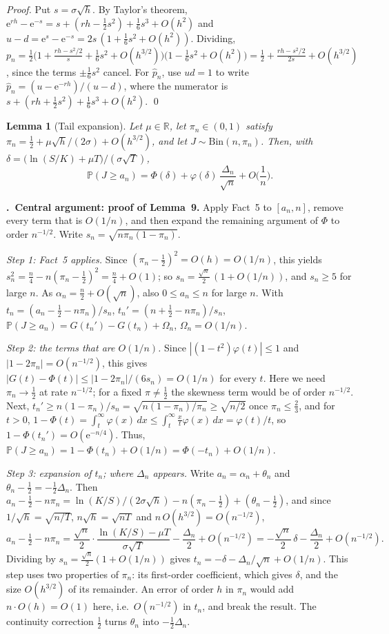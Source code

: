 \documentclass[11pt,a4paper]{article}
\theoremstyle{tight}
\newtheorem{lem}[thm]{Lemma}
\theoremstyle{tightrm}
\newcounter{sect}\setcounter{sect}{-1}
\newcounter{subsect}[sect]
\renewcommand{\thesubsect}{\thesect.\arabic{subsect}}
\newcommand{\subsect}[1]{\par\vspace{1.5pt}\noindent\stepcounter{subsect}\textbf{\thesubsect\ #1}\enspace}
\newcommand{\R}{\mathbb{R}}
\newcommand{\Prob}{\mathbb{P}}
\newcommand{\e}{\mathrm{e}}
\renewenvironment{proof}[1][Proof]{\par\textit{#1.}\enspace}{\qed\par}
\begin{document}
\begin{proof}
Put $s=\sigma\sqrt h$. By Taylor's theorem, $\e^{rh}-\e^{-s}=s+(rh-\tfrac12s^2)+\tfrac16s^3+O(h^2)$ and $u-d=\e^s-\e^{-s}=2s\,(1+\tfrac16s^2+O(h^2))$. Dividing, $p_n=\tfrac12\big(1+\tfrac{rh-s^2/2}{s}+\tfrac16s^2+O(h^{3/2})\big)\big(1-\tfrac16s^2+O(h^2)\big)=\tfrac12+\tfrac{rh-s^2/2}{2s}+O(h^{3/2})$, since the terms $\pm\tfrac16s^2$ cancel. For $\hat p_n$, use $ud=1$ to write $\hat p_n=(u-\e^{-rh})/(u-d)$, where the numerator is $s+(rh+\tfrac12s^2)+\tfrac16s^3+O(h^2)$.
\end{proof}
\begin{lem}[Tail expansion]
Let $\mu\in\R$, let $\pi_n\in(0,1)$ satisfy $\pi_n=\tfrac12+\mu\sqrt h/(2\sigma)+O(h^{3/2})$, and let $J\sim\mathrm{Bin}(n,\pi_n)$. Then, with $\delta=\big(\ln(S/K)+\mu T\big)/(\sigma\sqrt T)$,
\[
\Prob(J\ge a_n)=\Phi(\delta)+\varphi(\delta)\,\frac{\Delta_n}{\sqrt n}+O\Big(\frac1n\Big). 
\]
\end{lem}

\subsect{Central argument: proof of Lemma~9.}
Apply Fact~5 to $[a_n,n]$, remove every term that is $O(1/n)$, and then expand the remaining argument of $\Phi$ to order $n^{-1/2}$. Write $s_n=\sqrt{n\pi_n(1-\pi_n)}$.

\emph{Step 1: Fact~5 applies.} Since $(\pi_n-\tfrac12)^2=O(h)=O(1/n)$, this yields $s_n^2=\tfrac n4-n(\pi_n-\tfrac12)^2=\tfrac n4+O(1)$; so $s_n=\tfrac{\sqrt n}2\,(1+O(1/n))$, and $s_n\ge5$ for large $n$. As $\alpha_n=\tfrac n2+O(\sqrt n)$, also $0\le a_n\le n$ for large $n$. With $t_n=(a_n-\tfrac12-n\pi_n)/s_n$, $t_n'=(n+\tfrac12-n\pi_n)/s_n$, $\Prob(J\ge a_n)=G(t_n')-G(t_n)+\Omega_n$, $\Omega_n=O(1/n)$.

\emph{Step 2: the terms that are $O(1/n)$.} Since $|(1-t^2)\varphi(t)|\le1$ and $|1-2\pi_n|=O(n^{-1/2})$, this gives $|G(t)-\Phi(t)|\le|1-2\pi_n|/(6s_n)=O(1/n)$ for every $t$. Here we need $\pi_n\to\tfrac12$ at rate $n^{-1/2}$; for a fixed $\pi\ne\tfrac12$ the skewness term would be of order $n^{-1/2}$.
Next, $t_n'\ge n(1-\pi_n)/s_n=\sqrt{n(1-\pi_n)/\pi_n}\ge\sqrt{n/2}$ once $\pi_n\le\tfrac23$, and for $t>0$, $1-\Phi(t)=\int_t^\infty\varphi(x)\,dx\le\int_t^\infty\tfrac xt\varphi(x)\,dx=\varphi(t)/t$, so $1-\Phi(t_n')=O(\e^{-n/4})$. Thus, $\Prob(J\ge a_n)=1-\Phi(t_n)+O(1/n)=\Phi(-t_n)+O(1/n)$.

\emph{Step 3: expansion of $t_n$; where $\Delta_n$ appears.} Write $a_n=\alpha_n+\theta_n$ and $\theta_n-\tfrac12=-\tfrac12\Delta_n$. Then $a_n-\tfrac12-n\pi_n=\ln(K/S)/(2\sigma\sqrt h)-n(\pi_n-\tfrac12)+(\theta_n-\tfrac12)$, and since $1/\sqrt h=\sqrt{n/T}$, $n\sqrt h=\sqrt{nT}$ and $n\,O(h^{3/2})=O(n^{-1/2})$,
\[
a_n-\tfrac12-n\pi_n =\frac{\sqrt n}{2}\cdot\frac{\ln(K/S)-\mu T}{\sigma\sqrt T}-\frac{\Delta_n}{2}+O(n^{-1/2}) =-\frac{\sqrt n}{2}\,\delta-\frac{\Delta_n}{2}+O(n^{-1/2}).
\]
Dividing by $s_n=\tfrac{\sqrt n}{2}(1+O(1/n))$ gives $t_n=-\delta-\Delta_n/\sqrt n+O(1/n)$. This step uses two properties of $\pi_n$: its first-order coefficient, which gives $\delta$, and the size $O(h^{3/2})$ of its remainder. An error of order $h$ in $\pi_n$ would add $n\cdot O(h)=O(1)$ here, i.e.\ $O(n^{-1/2})$ in $t_n$, and break the result. The continuity correction $\tfrac12$ turns $\theta_n$ into $-\tfrac12\Delta_n$.
\end{document}
